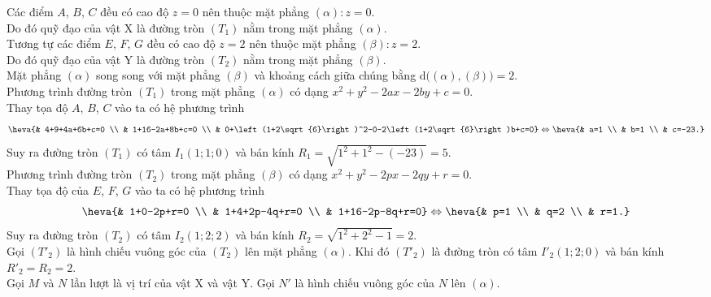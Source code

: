 \begin{ex}
{\begin{center}
		\end{center}
		Các điểm $A$, $B$, $C$ đều có cao độ $z=0$ nên thuộc mặt phẳng $(\alpha) \colon z=0$.\\
		Do đó quỹ đạo của vật X là đường tròn $(T_1)$ nằm trong mặt phẳng $(\alpha)$.\\
		Tương tự các điểm $E$, $F$, $G$ đều có cao độ $z=2$ nên thuộc mặt phẳng $(\beta) \colon z=2$.\\
		Do đó quỹ đạo của vật Y là đường tròn $(T_2)$ nằm trong mặt phẳng $(\beta)$.\\
		Mặt phẳng $(\alpha)$ song song với mặt phẳng $(\beta)$ và khoảng cách giữa chúng bằng $\mathrm{d}\big((\alpha), (\beta)\big) = 2$.\\
		Phương trình đường tròn $(T_1)$ trong mặt phẳng $(\alpha)$ có dạng $x^2+y^2-2ax-2by+c=0$.\\
		Thay tọa độ $A$, $B$, $C$ vào ta có hệ phương trình
		\[
		\heva{& 4+9+4a+6b+c=0 \\ & 1+16-2a+8b+c=0 \\ & 0+\left(1+2\sqrt{6}\right)^2-0-2\left(1+2\sqrt{6}\right)b+c=0} \Leftrightarrow \heva{& a=1 \\ & b=1 \\ & c=-23.}
		\]
		Suy ra đường tròn $(T_1)$ có tâm $I_1(1;1;0)$ và bán kính $R_1 = \sqrt{1^2+1^2-(-23)} = 5$.\\
		Phương trình đường tròn $(T_2)$ trong mặt phẳng $(\beta)$ có dạng $x^2+y^2-2px-2qy+r=0$.\\
		Thay tọa độ của $E$, $F$, $G$ vào ta có hệ phương trình
		\[
		\heva{& 1+0-2p+r=0 \\ & 1+4+2p-4q+r=0 \\ & 1+16-2p-8q+r=0} \Leftrightarrow \heva{& p=1 \\ & q=2 \\ & r=1.}
		\]
		Suy ra đường tròn $(T_2)$ có tâm $I_2(1;2;2)$ và bán kính $R_2 = \sqrt{1^2+2^2-1} = 2$.\\
		Gọi $(T'_2)$ là hình chiếu vuông góc của $(T_2)$ lên mặt phẳng $(\alpha)$. Khi đó $(T'_2)$ là đường tròn có tâm $I'_2(1;2;0)$ và bán kính $R'_2 = R_2 = 2$.\\
		Gọi $M$ và $N$ lần lượt là vị trí của vật X và vật Y. Gọi $N'$ là hình chiếu vuông góc của $N$ lên $(\alpha)$.\\
}
\end{ex}
